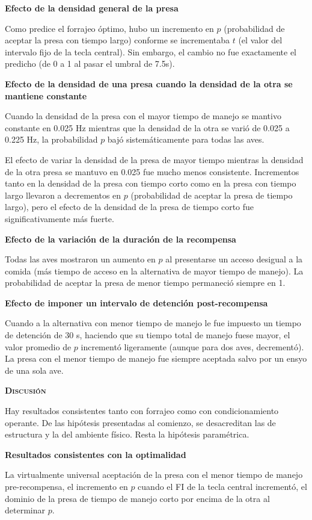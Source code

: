 \documentclass[a4paper,12pt]{article}
\begin{document}
{\bfseries Efecto de la densidad general de la presa}

Como predice el forrajeo óptimo, hubo un incremento en $p$ (probabilidad de aceptar la presa con tiempo largo) conforme se incrementaba $t$ (el valor del intervalo fijo de la tecla central). Sin embargo, el cambio no fue exactamente el predicho (de 0 a 1 al pasar el umbral de 7.5s).

{\bfseries Efecto de la densidad de una presa cuando la densidad de la otra se mantiene constante}

Cuando la densidad de la presa con el mayor tiempo de manejo se mantivo constante en 0.025 Hz mientras que la densidad de la otra se varió de 0.025 a 0.225 Hz, la probabilidad $p$ bajó sistemáticamente para todas las aves.

El efecto de variar la densidad de la presa de mayor tiempo mientras la densidad de la otra presa se mantuvo en 0.025 fue mucho menos consistente.
Incrementos tanto en la densidad de la presa con tiempo corto como en la presa con tiempo largo llevaron a decrementos en $p$ (probabilidad de aceptar la presa de tiempo largo), pero el efecto de la densidad de la presa de tiempo corto fue significativamente más fuerte.

{\bfseries Efecto de la variación de la duración de la recompensa}

Todas las aves mostraron un aumento en $p$ al presentarse un acceso desigual a la comida (más tiempo de acceso en la alternativa de mayor tiempo de manejo). La probabilidad de aceptar la presa de menor tiempo permaneció siempre en 1.

{\bfseries Efecto de imponer un intervalo de detención post-recompensa}

Cuando a la alternativa con menor tiempo de manejo le fue impuesto un tiempo de detención de 30 s, haciendo que su tiempo total de manejo fuese mayor, el valor promedio de $p$ incrementó ligeramente (aunque para dos aves, decrementó). La presa con el menor tiempo de manejo fue siempre aceptada salvo por un ensyo de una sola ave.

{\scshape\bfseries Discusión}

Hay resultados consistentes tanto con forrajeo como con condicionamiento operante. De las hipótesis presentadas al comienzo, se desacreditan las de estructura y la del ambiente físico. Resta la hipótesis paramétrica.

{\bfseries Resultados consistentes con la optimalidad}

La virtualmente universal aceptación de la presa con el menor tiempo de manejo pre-recompensa, el incremento en $p$ cuando el FI de la tecla central incrementó, el dominio de la presa de tiempo de manejo corto por encima de la otra al determinar $p$.
\end{document}
